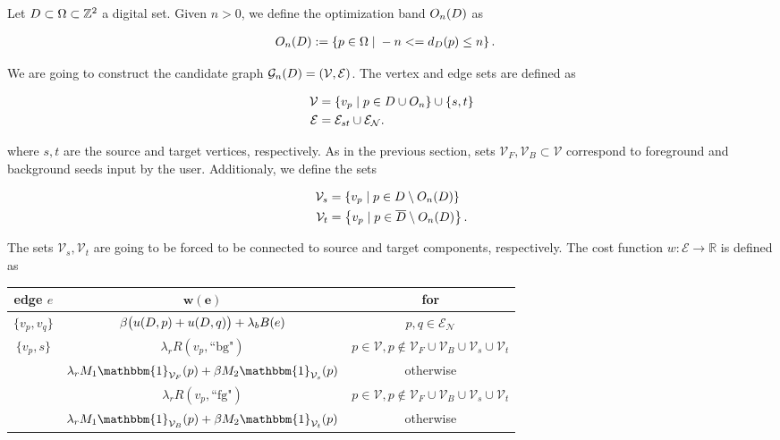 Let $D \subset \Omega \subset \mathbb{Z}^2$ a digital set. Given $n>0$, we define the optimization band $O_n(D)$ as

\begin{align*}
	O_n(D) &:=\left\{ p \in \Omega \; | \; -n <= d_{D}(p) \leq n \right\}.
\end{align*}

We are going to construct the candidate graph $\mathcal{G}_n(D) = ( \mathcal{V},\mathcal{E})$. The vertex and edge sets are defined as 

\begin{align*}
	\mathcal{V} &= \{ v_p \; | \; p \in D \cup O_n \} \cup \{s,t\} \\
	\mathcal{E} &= \mathcal{E}_{st} \cup \mathcal{E}_\mathcal{N}.
\end{align*}

where $s,t$ are the source and target vertices, respectively. As in the previous section, sets $\mathcal{V}_F,\mathcal{V}_B \subset \mathcal{V}$ correspond to foreground and background seeds input by the user. Additionaly, we define the sets

\begin{align*}
	\mathcal{V}_s &= \left\{ v_p \; | \; p \in D \setminus O_n(D) \right\}\\
	\mathcal{V}_t &= \left\{ v_p \; | \; p \in \overline{D} \setminus O_n(D) \right\}.
\end{align*}

The sets $\mathcal{V}_s, \mathcal{V}_t$ are going to be forced to be connected to source and target components, respectively. The cost function $w:\mathcal{E}\rightarrow \mathbb{R}$ is defined as 

\begin{table}[H]
\centering
\setlength{\extrarowheight}{0.75em}
\begin{tabular}{|c|c|c|}
\hline
\textbf{edge} $e$ & $\mathbf{w(e)}$ & \textbf{for}\\
\hline
$\{v_p, v_q\}$ & $\beta \big(u(D,p) + u(D,q)\big) + \lambda_bB(e)$ & $p,q \in \mathcal{E}_{\mathcal{N}}$\\
\hline
\multirow{3}{*}{$\{v_p, s\}$} & $\lambda_r R(v_p,\text{``bg"})$ & $p \in \mathcal{V}, p \notin \mathcal{V}_F \cup \mathcal{V}_B \cup \mathcal{V}_s \cup \mathcal{V}_t$\\
& $\lambda_r M_1\mathbbm{1}_{\mathcal{V}_F}(p) + \beta M_2\mathbbm{1}_{\mathcal{V}_s}(p)$ & otherwise \\
\hline
\multirow{3}{*}{$\{v_p, t\}$} & $\lambda_r R(v_p,\text{``fg"})$ & $p \in \mathcal{V}, p \notin \mathcal{V}_F \cup \mathcal{V}_B \cup \mathcal{V}_s \cup \mathcal{V}_t$ \\
& $\lambda_r M_1\mathbbm{1}_{\mathcal{V}_B}(p) + \beta M_2\mathbbm{1}_{\mathcal{V}_t}(p)$ & otherwise \\
\hline
\end{tabular}
\end{table}

